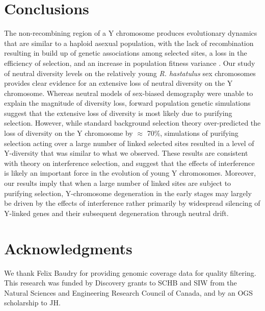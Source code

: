 \documentclass[9pt,twocolumn,twoside,lineno]{gsajnl}
\begin{document}
\section*{Conclusions}
The non-recombining region of a Y chromosome produces evolutionary dynamics that are similar to a haploid asexual population, with the lack of recombination resulting in build up of genetic associations among selected sites, a loss in the efficiency of selection, and an increase in population fitness variance \citep{fisher1930genetical, muller1964relation, hill1966HReffect, mcvean2000,KaiserCharlesworth,good2014genetic}. Our study of neutral diversity levels on the relatively young \textit{R. hastatulus} sex chromosomes provides clear evidence for an extensive loss of neutral diversity on the Y chromosome. Whereas neutral models of sex-biased demography were unable to explain the magnitude of diversity loss, forward population genetic simulations suggest that the extensive loss of diversity is most likely due to purifying selection. However, while standard background selection theory over-predicted the loss of diversity on the Y chromosome by $\approx$ 70\%, simulations of purifying selection acting over a large number of linked selected sites resulted in a level of Y-diversity that was similar to what we observed. These results are consistent with theory on interference selection, and suggest that the effects of interference is likely an important force in the evolution of young Y chromosomes. Moreover, our results imply that when a large number of linked sites are subject to purifying selection, Y-chromosome degeneration in the early stages may largely be driven by the effects of interference rather primarily by widespread silencing of Y-linked genes and their subsequent degeneration through neutral drift.

\section*{Acknowledgments}
We thank Felix Baudry for providing genomic coverage data for quality filtering. This research was funded by Discovery grants to SCHB and SIW from the Natural Sciences and Engineering Research Council of Canada, and by an OGS scholarship to JH.


\end{document}
